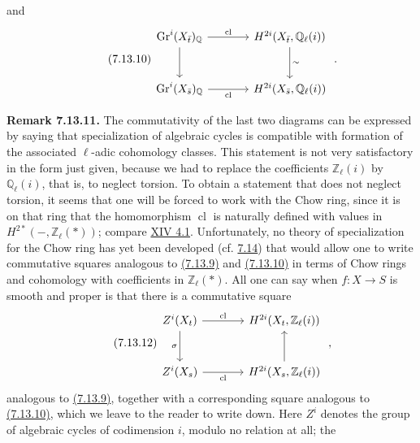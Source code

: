 and
\begin{equation}\tag{7.13.10}
\begin{tikzcd}[column sep=large,row sep=large]
\Gr^i(X_{\bar t})_{\mathbb Q} \arrow[r,"\operatorname{cl}"] \arrow[d] &
H^{2i}(X_{\bar t},\mathbb Q_\ell(i)) \arrow[d,"\sim"]\\
\Gr^i(X_{\bar s})_{\mathbb Q} \arrow[r,"\operatorname{cl}"'] &
H^{2i}(X_{\bar s},\mathbb Q_\ell(i))
\end{tikzcd}
\;.
\end{equation}

\textbf{Remark 7.13.11.}
The commutativity of the last two diagrams can be expressed by saying that
specialization of algebraic cycles is compatible with formation of the
associated $\ell$-adic cohomology classes. This statement is not very
satisfactory in the form just given, because we had to replace the
coefficients $\mathbb Z_\ell(i)$ by $\mathbb Q_\ell(i)$, that is, to neglect
torsion. To obtain a statement that does not neglect torsion, it seems that
one will be forced to work with the Chow ring, since it is on that ring that
the homomorphism $\operatorname{cl}$ is naturally defined with values in
$H^{2*}(-,\mathbb Z_\ell(*))$; compare \hyperlink{sga6.e14.para.4-1}{XIV 4.1}. Unfortunately, no theory of
specialization for the Chow ring has yet been developed (cf. \hyperlink{sga6.e10.sec.7.14}{7.14}) that would
allow one to write commutative squares analogous to \hyperlink{sga6.e10.eq.7-13-9}{(7.13.9)} and \hyperlink{sga6.e10.eq.7-13-10}{(7.13.10)} in
terms of Chow rings and cohomology with coefficients in
$\mathbb Z_\ell(*)$. All one can say when $f:X\to S$ is smooth and proper is
that there is a commutative square
\begin{equation}\tag{7.13.12}
\begin{tikzcd}[column sep=large,row sep=large]
Z^i(X_t) \arrow[r,"\operatorname{cl}"] \arrow[d,"\sigma"'] &
H^{2i}(X_t,\mathbb Z_\ell(i))\\
Z^i(X_s) \arrow[r,"\operatorname{cl}"'] &
H^{2i}(X_s,\mathbb Z_\ell(i)) \arrow[u]
\end{tikzcd}
\;,
\end{equation}
analogous to \hyperlink{sga6.e10.eq.7-13-9}{(7.13.9)}, together with a corresponding square analogous to
\hyperlink{sga6.e10.eq.7-13-10}{(7.13.10)}, which we leave to the reader to write down. Here $Z^i$ denotes the
group of algebraic cycles of codimension $i$, modulo no relation at all; the
